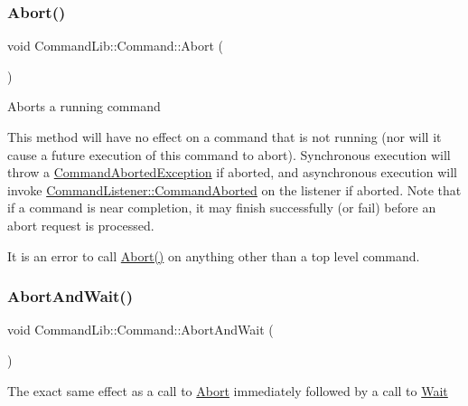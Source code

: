\subsubsection{\texorpdfstring{Abort()}{Abort()}}
{\footnotesize\ttfamily void Command\+Lib\+::\+Command\+::\+Abort (\begin{DoxyParamCaption}{ }\end{DoxyParamCaption})}



Aborts a running command

This method will have no effect on a command that is not running (nor will it cause a future execution of this command to abort). Synchronous execution will throw a \mbox{\hyperlink{class_command_lib_1_1_command_aborted_exception}{Command\+Aborted\+Exception}} if aborted, and asynchronous execution will invoke \mbox{\hyperlink{class_command_lib_1_1_command_listener_aa389ff6dd3895ce4ecc9447a23e4d9fc}{Command\+Listener\+::\+Command\+Aborted}} on the listener if aborted. Note that if a command is near completion, it may finish successfully (or fail) before an abort request is processed. 

It is an error to call \mbox{\hyperlink{class_command_lib_1_1_command_a247cbc7325e3b9d9d7044d449b989aa6}{Abort()}} on anything other than a top level command. \mbox{\label{class_command_lib_1_1_command_a6afa9e7eab83d5e59746fe15e295e066}} 
\subsubsection{\texorpdfstring{Abort\+And\+Wait()}{AbortAndWait()}\hspace{0.1cm}{\footnotesize\ttfamily [1/3]}}
{\footnotesize\ttfamily void Command\+Lib\+::\+Command\+::\+Abort\+And\+Wait (\begin{DoxyParamCaption}{ }\end{DoxyParamCaption})}



The exact same effect as a call to \mbox{\hyperlink{class_command_lib_1_1_command_a247cbc7325e3b9d9d7044d449b989aa6}{Abort}} immediately followed by a call to \mbox{\hyperlink{class_command_lib_1_1_command_ac4d49fbf9bbcc543fb57e4b04edf1ddb}{Wait}} 

\mbox{\label{class_command_lib_1_1_command_af51df64ba29324bbbbe13c647e708563}} 
